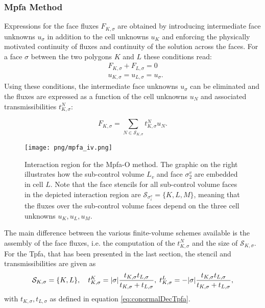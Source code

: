 \subsubsection{Mpfa Method}\label{cc_mpfa}
Expressions for the face fluxes $F_{K, \sigma}$ are obtained by introducing intermediate face unknowns $u_\sigma$ in addition to the cell unknowns $u_K$ and enforcing the physically motivated continuity of fluxes and continuity of the solution across the faces. For a face $\sigma$ between the two polygons $K$ and $L$ these conditions read:
\begin{equation}
    \begin{aligned}
        &F_{K, \sigma} + F_{L, \sigma} = 0 \\
        &{u}_{K,\sigma} = {u}_{L,\sigma} = {u}_{\sigma}.
        \label{eq:sigmaConditions}
    \end{aligned}
\end{equation}
Using these conditions, the intermediate face unknowns ${u}_\sigma$ can be eliminated and the fluxes are expressed as a function of the cell unknowns $u_N$ and associated transmissibilities $t^N_{K,\sigma}$:

\begin{equation}
    F_{K,\sigma} = \sum_{N \in \mathcal{S}_{K,\sigma}} t^N_{K,\sigma} u_{N}.
    \label{eq:FVFluxExpression}
\end{equation}

\begin{figure} [ht]
\centering
\texttt{[image: png/mpfa\_iv.png]}
\caption{Interaction region for the Mpfa-O method. The graphic on the right illustrates how the sub-control volume $L_v$ and face $\sigma^v_2$ are embedded in cell $L$. Note that the face stencils for all sub-control volume faces in the depicted interaction region are $\mathcal{S}_{\sigma^v_i} = \{ K,L,M \}$, meaning that the fluxes over the sub-control volume faces depend on the three cell unknowns $u_K, u_L, u_M$.}
\label{pc:interactionRegion_mpfa}
\end{figure}

The main difference between the various finite-volume schemes available is the assembly of the face fluxes, i.e. the computation of the $t^N_{K,\sigma}$ and the size of $\mathcal{S}_{K,\sigma}$. For the Tpfa, that has been presented in the last section, the stencil and transmissibilities are given as
\begin{equation*}
\mathcal{S}_{K,\sigma} = \lbrace K,L \rbrace, \quad t^K_{K,\sigma} =  \lvert{\sigma}\rvert  \frac{t_{K,\sigma} t_{L,\sigma}}{t_{K,\sigma} + t_{L,\sigma}},\; t^L_{K,\sigma} =  -\lvert{\sigma}\rvert  \frac{t_{K,\sigma} t_{L,\sigma}}{t_{K,\sigma} + t_{L,\sigma}},
\end{equation*}
with $t_{K,\sigma},t_{L,\sigma}$ as defined in equation \eqref{eq:conormalDecTpfa}.

